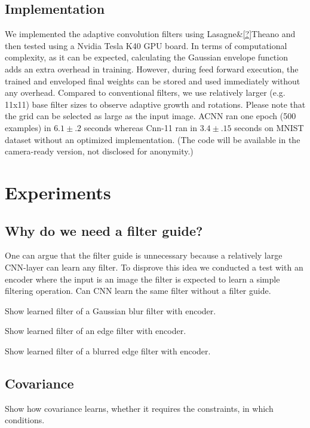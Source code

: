 \documentclass{bmvc2k}
\begin{document}
\subsection{Implementation}

We implemented the adaptive convolution filters using Lasagne\&\ref{?}Theano \cite{theano} and then tested using a Nvidia Tesla K40 GPU board. In terms of computational complexity, as it can be expected, calculating the Gaussian envelope function adds an extra overhead in training. However, during feed forward execution, the trained and enveloped final weights can be stored and used immediately without any overhead. Compared to conventional filters, we use relatively larger (e.g. 11x11) base filter sizes to observe adaptive growth and rotations. Please note that the grid can be selected as large as the input image. ACNN ran one epoch (500 examples) in $6.1 \pm .2$ seconds whereas Cnn-11 ran in $3.4 \pm .15$ seconds on MNIST dataset without an optimized implementation. (The code will be available in the camera-ready version, not disclosed for anonymity.)

\section{Experiments}
\label{sec:experiments}

\subsection{Why do we need a filter guide?}

One can argue that the filter guide is unnecessary because a relatively large CNN-layer can learn any filter. To disprove this idea we conducted a test with an encoder where the input is an image the filter is expected to learn a simple filtering operation. Can CNN learn the same filter without a filter guide. 

Show learned filter of a Gaussian blur filter with encoder. 

Show learned filter of an edge filter with encoder.

Show learned filter of a blurred edge filter with encoder.  


\subsection{Covariance}

Show how covariance learns, whether it requires the constraints, in which conditions. \\
\end{document}

